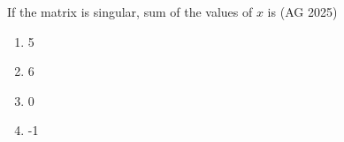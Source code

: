 \item If the matrix  is singular, sum of the values of $x$ is
\hfill(AG 2025)
\begin{multicols}{4}
\begin{enumerate}
\item 5
\item 6
\item 0
\item -1
\end{enumerate}
\end{multicols}
